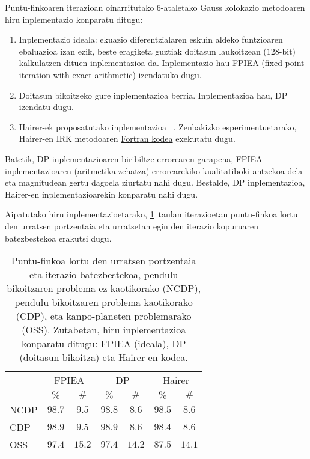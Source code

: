 Puntu-finkoaren iterazioan oinarritutako $6$-ataletako Gauss kolokazio metodoaren hiru inplementazio konparatu ditugu:
\begin{enumerate}
\item Inplementazio ideala: ekuazio diferentzialaren eskuin aldeko funtzioaren ebaluazioa izan ezik, beste eragiketa guztiak doitasun laukoitzean ($128$-bit) kalkulatzen dituen inplementazioa da. Inplementazio hau FPIEA (fixed point iteration with exact arithmetic) izendatuko dugu.

\item Doitasun bikoitzeko gure inplementazioa berria. Inplementazioa hau, DP izendatu dugu.

\item Hairer-ek proposatutako inplementazioa ~\cite{Hairer2008}. Zenbakizko esperimentuetarako, Hairer-en IRK metodoaren \href{http://www.unige.ch/~hairer/preprints.html}{Fortran kodea} exekutatu dugu.     

\end{enumerate}

Batetik, DP inplementazioaren biribiltze errorearen garapena, FPIEA  inplementazioaren (aritmetika zehatza) errorearekiko kualitatiboki antzekoa dela eta magnitudean gertu dagoela ziurtatu nahi dugu. Bestalde, DP inplementazioa, Hairer-en inplementazioarekin konparatu nahi dugu.

Aipatutako hiru inplementazioetarako, \ref{tab:fperr}~taulan iterazioetan puntu-finkoa lortu den urratsen portzentaia eta urratsetan egin den iterazio kopuruaren batezbestekoa erakutsi dugu.

\begin{table}
\caption[ Urratsen puntu-fikoaren iterazio portzentaia eta iterazio kopuruaren batezbestekoa.] 
{\small{ Puntu-finkoa lortu den urratsen portzentaia eta iterazio batezbestekoa, pendulu bikoitzaren problema ez-kaotikorako (NCDP), pendulu bikoitzaren problema kaotikorako (CDP), eta kanpo-planeten problemarako (OSS). Zutabetan, hiru inplementazioa konparatu ditugu: FPIEA (ideala), DP (doitasun bikoitza) eta Hairer-en kodea.}}
\label{tab:fperr}       %
\centering
{%
\begin{tabular}{ l c c c c c c } 
 \hline
                 &  \multicolumn{2}{c}{FPIEA}  & \multicolumn{2}{c}{DP} & \multicolumn{2}{c}{Hairer} \\
                 &     $\%$        &  $\#$        &      $\%$           &   $\#$      &    $\%$       &  $\#$      \\
 \hline
 NCDP            & $98.7$    & $9.5$   & $98.8$     & $8.6$   &  $98.5$ & $8.6$  \\ 
 CDP             & $98.9$    & $9.5$   & $98.9$     & $8.6$   &  $98.4$ & $8.6$  \\ 
 OSS             & $97.4$    & $15.2$  & $97.4$     & $14.2$  &  $87.5$ & $14.1$ \\ 
   \hline
 \end{tabular}}
 \end{table}


